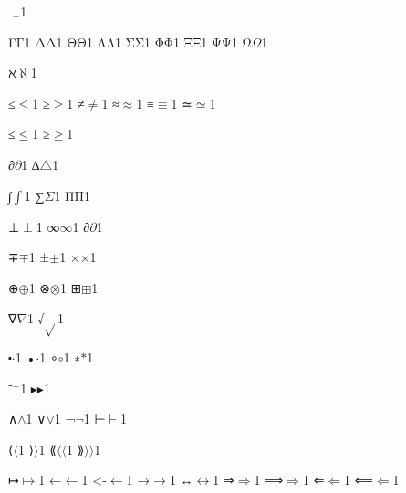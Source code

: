{  {₋}{{\ensuremath{_-}}}1

  {Γ}{{\ensuremath{\mathrm{\Gamma}}}}1
  {Δ}{{\ensuremath{\mathrm{\Delta}}}}1
  {Θ}{{\ensuremath{\mathrm{\Theta}}}}1
  {Λ}{{\ensuremath{\mathrm{\Lambda}}}}1
  {Σ}{{\ensuremath{\mathrm{\Sigma}}}}1
  {Φ}{{\ensuremath{\mathrm{\Phi}}}}1
  {Ξ}{{\ensuremath{\mathrm{\Xi}}}}1
  {Ψ}{{\ensuremath{\mathrm{\Psi}}}}1
  {Ω}{{\ensuremath{\Omega}}}1

  {ℵ}{{\ensuremath{\aleph}}}1

  {≤}{{\ensuremath{\leq}}}1
  {≥}{{\ensuremath{\geq}}}1
  {≠}{{\ensuremath{\neq}}}1
  {≈}{{\ensuremath{\approx}}}1
  {≡}{{\ensuremath{\equiv}}}1
  {≃}{{\ensuremath{\simeq}}}1

  {≤}{{\ensuremath{\leq}}}1
  {≥}{{\ensuremath{\geq}}}1

  {∂}{{\ensuremath{\partial}}}1
  {∆}{{\ensuremath{\triangle}}}1 %

  {∫}{{\ensuremath{\int}}}1
  {∑}{{\ensuremath{\Sigma}}}1
  {Π}{{\ensuremath{\mathrm{\Pi}}}}1

  {⊥}{{\ensuremath{\perp}}}1
  {∞}{{\ensuremath{\infty}}}1
  {∂}{{\ensuremath{\partial}}}1

  {∓}{{\ensuremath{\mp}}}1
  {±}{{\ensuremath{\pm}}}1
  {×}{{\ensuremath{\times}}}1

  {⊕}{{\ensuremath{\oplus}}}1
  {⊗}{{\ensuremath{\otimes}}}1
  {⊞}{{\ensuremath{\boxplus}}}1

  {∇}{{\ensuremath{\nabla}}}1
  {√}{{\ensuremath{\sqrt{}}}}1

  {⬝}{{\ensuremath{\cdot}}}1
  {•}{{\ensuremath{\cdot}}}1
  {∘}{{\ensuremath{\circ}}}1
  {∗}{{\ensuremath{\ast}}}1

  {⁻}{{\ensuremath{^{-}}}}1
  {▸}{{\ensuremath{\blacktriangleright}}}1

  {∧}{{\ensuremath{\wedge}}}1
  {∨}{{\ensuremath{\vee}}}1
  {¬}{{\ensuremath{\neg}}}1
  {⊢}{{\ensuremath{\vdash}}}1

  {⟨}{{\ensuremath{\langle}}}1
  {⟩}{{\ensuremath{\rangle}}}1
  {⟪}{{\ensuremath{\langle\!\langle}}}1
  {⟫}{{\ensuremath{\rangle\!\rangle}}}1

  {↦}{{\ensuremath{\mapsto}}}1
  {←}{{\ensuremath{\leftarrow}}}1
  {<-}{{\ensuremath{\leftarrow}}}1
  {→}{{\ensuremath{\rightarrow}}}1
  {↔}{{\ensuremath{\leftrightarrow}}}1
  {⇒}{{\ensuremath{\Rightarrow}}}1
  {⟹}{{\ensuremath{\Longrightarrow}}}1
  {⇐}{{\ensuremath{\Leftarrow}}}1
  {⟸}{{\ensuremath{\Longleftarrow}}}1

}

